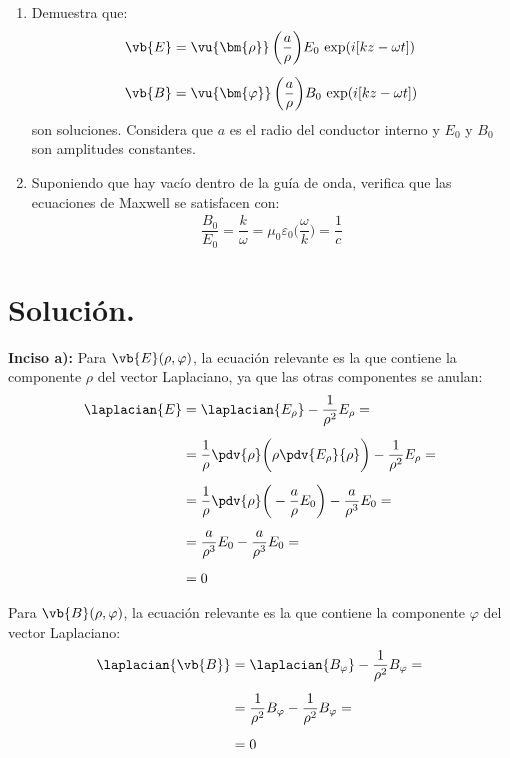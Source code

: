\begin{enumerate}[label=\alph*)]
\item Demuestra que:
\begin{align*}
\vb{E} &= \vu{\bm{\rho}} \, \bigg( \dfrac{a}{\rho} \bigg) E_{0} \, \exp(i [k z - \omega t]) \\[0.5em]
\vb{B} &= \vu{\bm{\varphi}} \, \bigg( \dfrac{a}{\rho} \bigg) B_{0} \, \exp(i [k z - \omega t])
\end{align*}
son soluciones. Considera que $a$ es el radio del conductor interno y $E_{0}$ y $B_{0}$ son amplitudes constantes.
\item Suponiendo que hay vacío dentro de la guía de onda, verifica que las ecuaciones de Maxwell se satisfacen con:
\begin{align*}
\dfrac{B_{0}}{E_{0}} = \dfrac{k}{\omega} = \mu_{0} \varepsilon_{0} \bigg( \dfrac{\omega}{k} \bigg) = \dfrac{1}{c}
\end{align*}
\end{enumerate}

\section{Solución.}

\noindent
\textbf{Inciso a):} Para $\vb{E} (\rho, \varphi)$, la ecuación relevante es la que contiene la componente $\rho$ del vector Laplaciano, ya que las otras componentes se anulan:
\begin{align*}
\laplacian{E} &= \laplacian{E_{\rho}} - \dfrac{1}{\rho^{2}} E_{\rho} = \\[0.5em]
&= \dfrac{1}{\rho} \pdv{\rho} \bigg( \rho \pdv{E_{\rho}}{\rho} \bigg) - \dfrac{1}{\rho^{2}} E_{\rho} = \\[0.5em]
&= \dfrac{1}{\rho} \pdv{\rho} \bigg( - \dfrac{a}{\rho} E_{0} \bigg) - \dfrac{a}{\rho^{3}} E_{0} = \\[0.5em]
&= \dfrac{a}{\rho^{3}} E_{0} - \dfrac{a}{\rho^{3}} E_{0} = \\[0.5em]
&= 0
\end{align*}

Para $\vb{B} (\rho, \varphi)$, la ecuación relevante es la que contiene la componente $\varphi$ del vector Laplaciano:
\begin{align*}
\laplacian{\vb{B}} &= \laplacian{B_{\varphi}} - \dfrac{1}{\rho^{2}} B_{\varphi} = \\[0.5em]
&= \dfrac{1}{\rho^{2}} B_{\varphi} - \dfrac{1}{\rho^{2}} B_{\varphi} = \\[0.5em]
&= 0
\end{align*}

